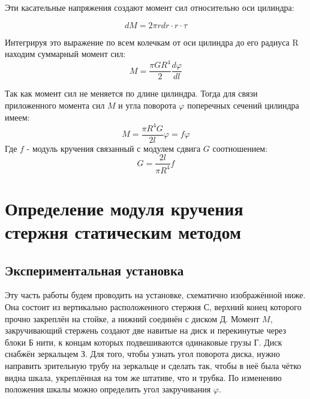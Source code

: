 \documentclass[a4paper]{article}
\begin{document}
Эти касательные напряжения создают момент сил относительно оси цилиндра:

\begin{equation}
    dM=2\pi r dr \cdot r\cdot \tau  
\end{equation}

Интегрируя это выражение по всем колечкам от оси цилиндра до его радиуса R находим суммарный
момент сил:
\begin{equation}
    M = \frac{\pi G R^{4}}{2} \frac{d \varphi }{d l} 
\end{equation}

Так как момент сил не меняется по длине цилиндра. Тогда для связи приложенного
момента сил $M$ и угла поворота $\varphi$ поперечных сечений цилиндра имеем:
\begin{equation}
    M=\frac{\pi R^{4}G}{2l}\varphi=f \varphi
\end{equation}
Где $f$ - модуль кручения связанный с модулем сдвига $G$ соотношением:
\begin{equation}
    G=\frac{2l}{\pi R^{4}}f
\end{equation}

\section{Определение модуля кручения стержня статическим методом}
\subsection{Экспериментальная установка}

Эту часть работы будем проводить на установке, схематично изображённой ниже. Она состоит из вертикально расположенного стержня С, верхний конец которого прочно закреплён на стойке, а нижний соединён с диском Д. Момент $M$, закручивающий стержень создают две навитые на диск и перекинутые через блоки Б нити, к концам которых подвешиваются одинаковые грузы Г. Диск снабжён зеркальцем З. Для того, чтобы узнать угол поворота диска, нужно направить зрительную трубу на зеркальце и сделать так, чтобы в неё была чётко видна шкала, укреплённая на том же штативе, что и трубка. По изменению положения шкалы можно определить угол закручивания $\varphi$.
\end{document}
